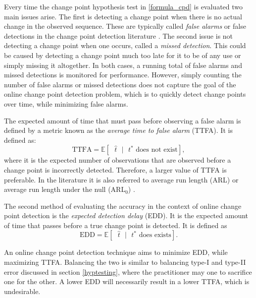 Every time the change point hypothesis test in \ref{formula_cpd} is evaluated two main issues arise. The first is detecting a change point when there is no actual change in the observed sequence. These are typically called \textit{false alarms} or false detections in the change point detection literature \cite{lee2010change}. The second issue is not detecting a change point when one occurs, called a \textit{missed detection}. This could be caused by detecting a change point much too late for it to be of any use or simply missing it altogether. In both cases, a running total of false alarms and missed detections is monitored for performance. However, simply counting the number of false alarms or missed detections does not capture the goal of the online change point detection problem, which is to quickly detect change points over time, while minimizing false alarms. 

The expected amount of time that must pass before observing a false alarm is defined by a metric known as the \textit{average time to false alarm} (TTFA). It is defined as:
\begin{equation}
\label{ttfa}
\text{TTFA} = \mathbb{E}[\text{ }  \hat{t} \text{ } |\text{ }  t^* \text{ does not exist} ],
\end{equation}
where it is the expected number of observations that are observed before a change point is incorrectly detected. Therefore, a larger value of TTFA is preferable. In the literature it is also referred to average run length (ARL) or average run length under the null (ARL$_0$) \cite{johnson2017detecting}. 

The second method of evaluating the accuracy in the context of online change point detection is the \textit{expected detection delay} (EDD). It is the expected amount of time that passes before a true change point is detected. It is defined as 
\begin{equation}
\label{edd}
\text{EDD} = \mathbb{E}[\text{ }  \hat{t} \text{ } |\text{ }  t^* \text{ does exists} ].
\end{equation}

An online change point detection technique aims to minimize EDD, while maximizing TTFA. Balancing the two is similar to balancing type-I and type-II error discussed in section \ref{hyptesting}, where the practitioner may one to sacrifice one for the other. A lower EDD will necessarily result in a lower TTFA, which is undesirable. 


